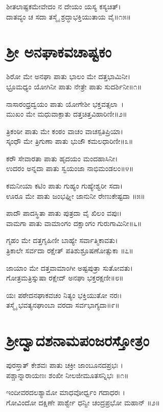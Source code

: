 ಶೀತಲಾಷ್ಟಕಮೇವೇದಂ ನ ದೇಯಂ ಯಸ್ಯ ಕಸ್ಯಚಿತ್।\\
ದಾತವ್ಯಂ ಚ ಸದಾ ತಸ್ಮೈ ಶ್ರದ್ಧಾಭಕ್ತಿಯುತಾಯ ವೈ॥೧೫॥

\section{ ಶ್ರೀ ಅನಘಾಕವಚಾಷ್ಟಕಂ }
ಶಿರೋ ಮೇ ಅನಘಾ ಪಾತು ಭಾಲಂ ಮೇ ದತ್ತಭಾಮಿನೀ।\\
ಭ್ರೂಮಧ್ಯಂ ಯೋಗಿನೀ ಪಾತು ನೇತ್ರೇ ಪಾತು ಸುದರ್ಶಿನೀ॥೧॥

ನಾಸಾರಂಧ್ರದ್ವಯಂ ಪಾತು ಯೋಗೇಶೀ ಭಕ್ತವತ್ಸಲಾ~।\\
ಮುಖಂ ಮೇ ಮಧುವಾಕ್ಪಾತು ದತ್ತಚಿತ್ತವಿಹಾರಿಣೀ॥೨॥

ತ್ರಿಕಂಠೀ ಪಾತು ಮೇ ಕಂಠಂ ವಾಚಂ ವಾಚಸ್ಪತಿಪ್ರಿಯಾ।\\
ಸ್ಕಂಧೌ ಮೇ ತ್ರಿಗುಣಾ ಪಾತು ಭುಜೌ ಕಮಲಧಾರಿಣೀ॥೩॥

ಕರೌ ಸೇವಾರತಾ ಪಾತು ಹೃದಯಂ ಮಂದಹಾಸಿನೀ।\\
ಉದರಂ ಅನ್ನದಾ ಪಾತು ಸ್ವಯಂಜಾ ನಾಭಿಮಂಡಲಂ॥೪॥

ಕಮನೀಯಾ ಕಟಿಂ ಪಾತು ಗುಹ್ಯಂ ಗುಹ್ಯೇಶ್ವರೀ ಸದಾ।\\
ಊರೂ ಮೇ ಪಾತು ಜಂಭಘ್ನೀ ಜಾನುನೀ ರೇಣುಕೇಷ್ಟದಾ ॥೫॥

ಪಾದೌ ಪಾದಸ್ಥಿತಾ ಪಾತು ಪುತ್ರದಾ ವೈ ಖಿಲಂ ವಪುಃ।\\
ವಾಮಗಾ ಪಾತು ವಾಮಾಂಗಂ ದಕ್ಷಾಂಗಂ ಗುರುಗಾಮಿನೀ॥೬॥

ಗೃಹಂ ಮೇ ದತ್ತಗೃಹಿಣೀ ಬಾಹ್ಯೇ ಸರ್ವಾತ್ಮಿಕಾವತು।\\
ತ್ರಿಕಾಲೇ ಸರ್ವದಾ ರಕ್ಷೇತ್ ಪತಿಶುಶ್ರೂಷಣೋತ್ಸುಕಾ ॥೭॥

ಜಾಯಾಂ ಮೇ ದತ್ತವಾಮಾಂಗೀ ಅಷ್ಟಪುತ್ರಾ ಸುತೋವತು।\\
ಗೋತ್ರಮತ್ರಿಸ್ನುಷಾ ರಕ್ಷೇದ್ ಅನಘಾ ಭಕ್ತರಕ್ಷಣೀ॥೮॥

ಯಃ ಪಠೇದನಘಾಕವಚಂ ನಿತ್ಯಂ ಭಕ್ತಿಯುತೋ ನರಃ।\\
ತಸ್ಮೈ ಭವತ್ಯನಘಾಂಬಾ ವರದಾ ಸರ್ವಭಾಗ್ಯದಾ॥೯॥
\section{ಶ್ರೀದ್ವಾದಶನಾಮಪಂಜರಸ್ತೋತ್ರಂ}
ಪುರಸ್ತಾತ್ ಕೇಶವಃ ಪಾತು ಚಕ್ರೀ ಜಾಂಬೂನದಪ್ರಭಃ ।\\
ಪಶ್ಚಾನ್ನಾರಾಯಣಃ ಶಂಖೀ ನೀಲಜೀಮೂತಸನ್ನಿಭಃ ॥೧॥

ಇಂದೀವರದಲಶ್ಯಾಮೋ ಮಾಧವೋರ್ಧ್ವಂ ಗದಾಧರಃ ।\\
ಗೋವಿಂದೋ ದಕ್ಷಿಣೇ ಪಾರ್ಶ್ವೇ ಧನ್ವೀ ಚಂದ್ರಪ್ರಭೋ ಮಹಾನ್ ॥೨॥

